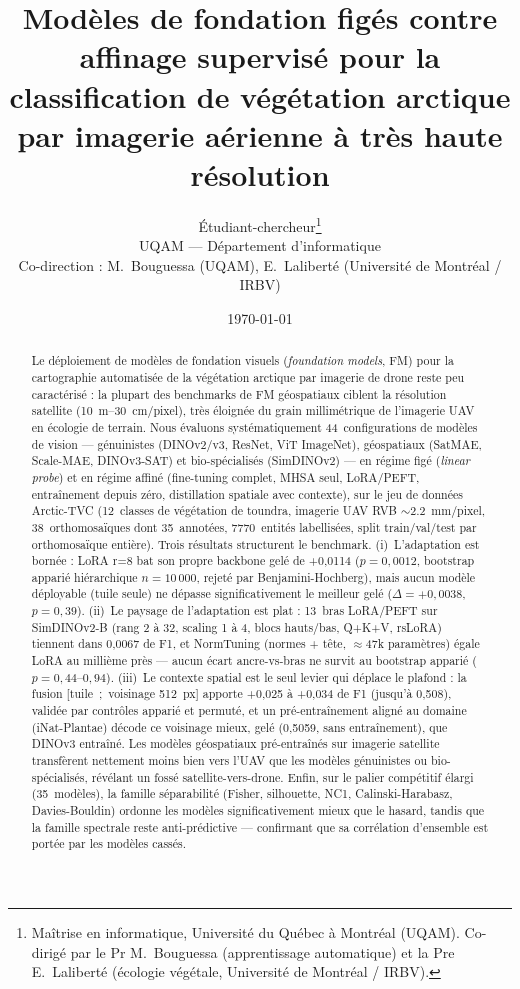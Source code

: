 \documentclass[11pt,a4paper]{article}
\title{\textbf{Modèles de fondation figés contre affinage supervisé pour la classification de végétation arctique par imagerie aérienne à très haute résolution}}
\author{
Étudiant-chercheur\thanks{Maîtrise en informatique, Université du Québec à Montréal (UQAM). Co-dirigé par le Pr M.\ Bouguessa (apprentissage automatique) et la Pre E.\ Laliberté (écologie végétale, Université de Montréal / IRBV).} \\
\small UQAM — Département d'informatique \\
\small Co-direction : M.\ Bouguessa (UQAM), E.\ Laliberté (Université de Montréal / IRBV)
}
\date{\today}
\begin{document}
\maketitle

\begin{abstract}
	Le déploiement de modèles de fondation visuels (\emph{foundation models}, FM) pour la cartographie automatisée de la végétation arctique par imagerie de drone reste peu caractérisé : la plupart des benchmarks de FM géospatiaux ciblent la résolution satellite (10~m--30~cm/pixel), très éloignée du grain millimétrique de l'imagerie UAV en écologie de terrain. Nous évaluons systématiquement 44~configurations de modèles de vision — génuinistes (DINOv2/v3, ResNet, ViT ImageNet), géospatiaux (SatMAE, Scale-MAE, DINOv3-SAT) et bio-spécialisés (SimDINOv2) — en régime figé (\emph{linear probe}) et en régime affiné (fine-tuning complet, MHSA seul, LoRA/PEFT, entraînement depuis zéro, distillation spatiale avec contexte), sur le jeu de données Arctic-TVC (12~classes de végétation de toundra, imagerie UAV RVB $\sim$2.2~mm/pixel, 38~orthomosaïques dont 35~annotées, 7770~entités labellisées, split train/val/test par orthomosaïque entière). Trois résultats structurent le benchmark. (i)~L'adaptation est bornée : LoRA r=8 bat son propre backbone gelé de +0,0114 ($p=0{,}0012$, bootstrap apparié hiérarchique $n=10\,000$, rejeté par Benjamini-Hochberg), mais aucun modèle déployable (tuile seule) ne dépasse significativement le meilleur gelé ($\Delta=+0{,}0038$, $p=0{,}39$). (ii)~Le paysage de l'adaptation est plat : 13~bras LoRA/PEFT sur SimDINOv2-B (rang 2 à 32, scaling 1 à 4, blocs hauts/bas, Q+K+V, rsLoRA) tiennent dans 0,0067 de F1, et NormTuning (normes + tête, $\approx$47k paramètres) égale LoRA au millième près — aucun écart ancre-vs-bras ne survit au bootstrap apparié ($p=0{,}44$--$0{,}94$). (iii)~Le contexte spatial est le seul levier qui déplace le plafond : la fusion [tuile~;~voisinage 512~px] apporte +0,025 à +0,034 de F1 (jusqu'à 0,508), validée par contrôles apparié et permuté, et un pré-entraînement aligné au domaine (iNat-Plantae) décode ce voisinage mieux, gelé (0,5059, sans entraînement), que DINOv3 entraîné. Les modèles géospatiaux pré-entraînés sur imagerie satellite transfèrent nettement moins bien vers l'UAV que les modèles génuinistes ou bio-spécialisés, révélant un fossé satellite-vers-drone. Enfin, sur le palier compétitif élargi (35~modèles), la famille séparabilité (Fisher, silhouette, NC1, Calinski-Harabasz, Davies-Bouldin) ordonne les modèles significativement mieux que le hasard, tandis que la famille spectrale reste anti-prédictive — confirmant que sa corrélation d'ensemble est portée par les modèles cassés.
\end{abstract}
\end{document}
